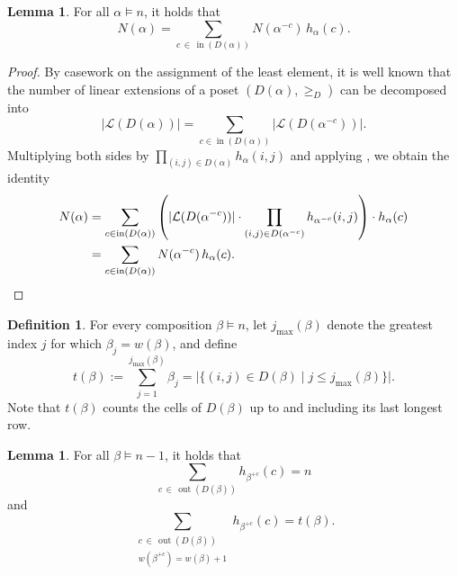 \documentclass[12pt]{amsart}
\DeclareMathOperator{\inn}{in}
\DeclareMathOperator{\out}{out}
\theoremstyle{definition}
\newtheorem{lemma}[theorem]{Lemma}
\newtheorem{definition}[theorem]{Definition}
\begin{document}
\begin{lemma}\label{lem:corner}
For all $\alpha\models n$, it holds that
\[N(\alpha) = \sum_{c\,\in\,\inn(D(\alpha))} N(\alpha^{-c})\,h_\alpha(c).\]
\end{lemma}

\begin{proof}
By casework on the assignment of the least element, it is well known that the number of linear extensions of a poset $(D(\alpha),\ge_D)$ can be decomposed into 
\[|\mathcal{L}(D(\alpha))| = \sum_{c\in\inn(D(\alpha))}|\mathcal{L}(D(\alpha^{-c}))|.\]
Multiplying both sides by $\prod_{(i,j)\in D(\alpha)}h_\alpha(i,j)$ and applying , we obtain the identity
\begin{align*}
N(\alpha) &= \sum_{c\in\inn(D(\alpha))}\left(|\mathcal{L}(D(\alpha^{-c}))|\cdot \prod_{(i,j)\in D(\alpha^{-c})}h_{\alpha^{-c}}(i,j)\right)\cdot h_\alpha(c) \\
&= \sum_{c\in\inn(D(\alpha))} N(\alpha^{-c})\,h_{\alpha}(c).\qedhere
\end{align*}
\end{proof}

\begin{definition}\label{def:a}
For every composition $\beta\models n$, let $j_{\max}(\beta)$ denote the greatest index
$j$ for which $\beta_j=w(\beta)$, and define
\[t(\beta) := \sum_{j=1}^{j_{\max}(\beta)}\beta_j = \bigl|\{(i,j)\in D(\beta)\mid j\le j_{\max}(\beta)\}\bigr|.\]
Note that $t(\beta)$ counts the cells of $D(\beta)$ up to and including its last longest row.
\end{definition}

\begin{lemma}\label{lem:hooksum}
For all $\beta\models n-1$, it holds that
\[\sum_{c\,\in\,\out(D(\beta))} h_{\beta^{+c}}(c) = n\]
and
\[\sum_{\substack{c\,\in\,\out(D(\beta)) \\ w(\beta^{+c})=w(\beta)+1}} h_{\beta^{+c}}(c) = t(\beta).\]
\end{lemma}
\end{document}
